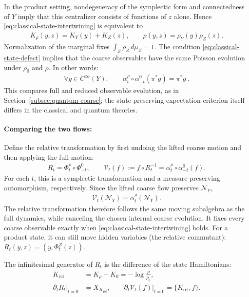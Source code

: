 \documentclass[a4paper,11pt]{article}
\theoremstyle{definition}
\newcommand{\nn}{\nonumber}
\begin{document}
In the product setting, nondegeneracy of the symplectic form and connectedness of $Y$ imply that this centralizer consists of functions of $z$ alone. Hence \eqref{eq:classical-state-intertwining} is equivalent to
\begin{align}\label{eq:classical-product-state-closure}
    K_\rho(y,z)=K_Y(y)+K_Z(z),
    \qquad
    \rho(y,z)=\rho_Y(y)\rho_Z(z).
\end{align}
Normalization of the marginal fixes $\int_Z\rho_Z\,d\mu_Z=1$. The condition \eqref{eq:classical-state-defect} implies that the coarse observables have the same Poisson evolution under $\rho_0$ and $\rho$. In other words:
\begin{align}
    \forall g\in C^\infty(Y):\qquad \alpha^\rho_t\circ\alpha_{-t}^0(\pi^*g)=\pi^*g\ .
\end{align}
This compares full and reduced observable evolution, as in Section~\ref{subsec:quantum-coarse}; the state-preserving expectation criterion itself differs in the classical and quantum theories.

\paragraph{Comparing the two flows:}
Define the relative transformation by first undoing the lifted coarse motion and then applying the full motion:
\begin{align}\label{eq:classical-relative-transformation}
    R_t=\Phi_t^\rho\circ\Phi_{-t}^0,
    \qquad
    \mathcal V_t(f):=f\circ R_t^{-1}
    =\alpha_t^\rho\circ\alpha_{-t}^0(f).
\end{align}
For each $t$, this is a symplectic transformation and a measure-preserving automorphism, respectively. Since the lifted coarse flow preserves $\mathcal N_Y$,
\begin{align}\label{eq:classical-relative-algebra-flow}
    \mathcal V_t(\mathcal N_Y)=\alpha_t^\rho(\mathcal N_Y).
\end{align}
The relative transformation therefore follows the same moving subalgebra as the full dynamics, while canceling the chosen internal coarse evolution. It fixes every coarse observable exactly when \eqref{eq:classical-state-intertwining} holds. For a product state, it can still move hidden variables (the relative commutant): $R_t(y,z)=(y,\Phi_t^Z(z))$.

The infinitesimal generator of $R_t$ is the difference of the state Hamiltonians:
\begin{align}\label{eq:classical-relative-Hamiltonian}
    K_{\mathrm{rel}}&=K_\rho-K_0=-\log\frac{\rho}{\rho_0},\nn\\
    \left.\partial_tR_t\right|_{t=0}&=X_{K_{\mathrm{rel}}},\qquad
    \left.\partial_t\mathcal V_t(f)\right|_{t=0}=\{K_{\mathrm{rel}},f\}.
\end{align}
\end{document}
